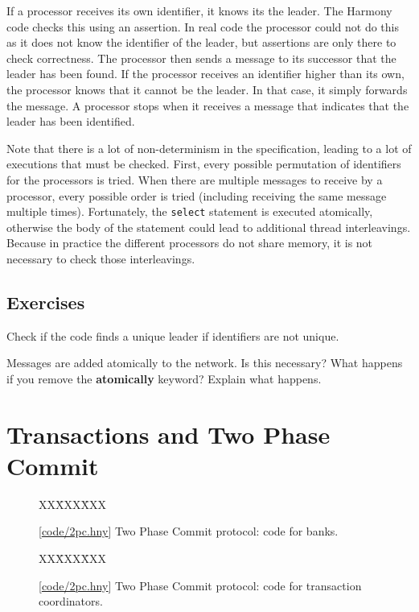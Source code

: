 \documentclass{report}
\newcommand{\harmonysource}[1]{
\begin{tabbing}
XX\=XXX\=XXX\kill
    
\end{tabbing}
}
\newcommand{\harmonylink}[1]{%
[\href{https://harmony.cs.cornell.edu/#1}{\underline{#1}}]%
}
\newenvironment{code}{
\tcolorbox
}{
\endtcolorbox
}
\begin{document}
If a processor receives its own identifier, it knows its the leader.
The Harmony code checks this using an assertion.
In real code the processor could not do this as it does not know
the identifier of the leader, but assertions are only there to check
correctness.
The processor then sends a message to its successor that the leader
has been found.
If the processor receives an identifier higher than its own, the
processor knows that it cannot be the leader.
In that case, it simply forwards the message.
A processor stops when it receives a message that indicates that
the leader has been identified.

Note that there is a lot of non-determinism in the specification, leading
to a lot of executions that must be checked.
First, every possible permutation of identifiers for the processors
is tried.  When there are multiple messages to receive by a processor,
every possible order is tried (including receiving the same message
multiple times).  Fortunately, the \texttt{select} statement is executed
atomically, otherwise the body of the statement could lead to additional
thread interleavings.  Because in practice the different processors do
not share memory, it is not necessary to check those interleavings.

\section*{Exercises}
\begin{problems}
\item Check if the code finds a unique leader if identifiers are not unique.
\item Messages are added atomically to the network.  Is this necessary?
What happens if you remove the \textbf{atomically} keyword?  Explain what happens.
\end{problems}

\chapter{Transactions and Two Phase Commit}
\label{ch:2pc}

\begin{figure}
\begin{code}
\harmonysource{2pc1}
\end{code}
\caption{\harmonylink{code/2pc.hny} Two Phase Commit protocol: code for banks.}
\label{fig:2pc1}
\end{figure}

\begin{figure}
\begin{code}
\harmonysource{2pc2}
\end{code}
\caption{\harmonylink{code/2pc.hny} Two Phase Commit protocol: code for transaction coordinators.}
\label{fig:2pc2}
\end{figure}
\end{document}

